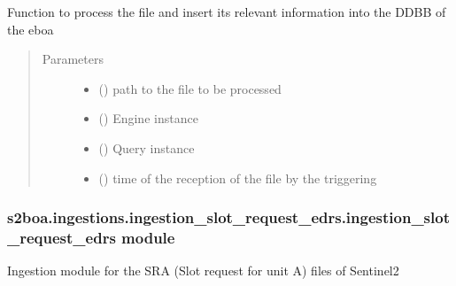 \begin{fulllineitems}
\label{\detokenize{s2boa.ingestions:s2boa.ingestions.ingestion_rep_arc.ingestion_rep_arc.process_file}}
\sphinxAtStartPar
Function to process the file and insert its relevant information
into the DDBB of the eboa
\begin{quote}\begin{description}
\item[{Parameters}] \leavevmode\begin{itemize}
\item {} 
\sphinxAtStartPar
{} () \textendash{} path to the file to be processed

\item {} 
\sphinxAtStartPar
{} () \textendash{} Engine instance

\item {} 
\sphinxAtStartPar
{} () \textendash{} Query instance

\item {} 
\sphinxAtStartPar
{} () \textendash{} time of the reception of the file by the triggering

\end{itemize}

\end{description}\end{quote}

\end{fulllineitems}



\subsubsection{s2boa.ingestions.ingestion\_slot\_request\_edrs.ingestion\_slot\_request\_edrs module}
\label{\detokenize{s2boa.ingestions:module-s2boa.ingestions.ingestion_slot_request_edrs.ingestion_slot_request_edrs}}\label{\detokenize{s2boa.ingestions:s2boa-ingestions-ingestion-slot-request-edrs-ingestion-slot-request-edrs-module}}
\sphinxAtStartPar
Ingestion module for the SRA (Slot request for unit A) files of Sentinel\sphinxhyphen{}2

